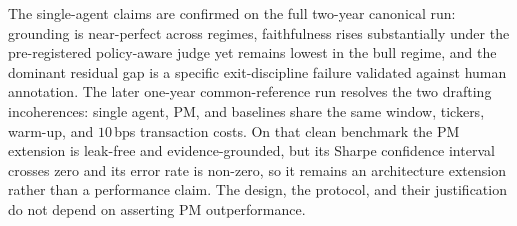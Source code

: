 The single-agent claims are confirmed on the full two-year canonical run: grounding is
near-perfect across regimes, faithfulness rises substantially under the pre-registered
policy-aware judge yet remains lowest in the bull regime, and the dominant residual gap is a
specific exit-discipline failure validated against human annotation. The later one-year
common-reference run resolves the two drafting incoherences: single agent, PM, and baselines
share the same window, tickers, warm-up, and $10$\,bps transaction costs. On that clean
benchmark the PM extension is leak-free and evidence-grounded, but its Sharpe confidence
interval crosses zero and its error rate is non-zero, so it remains an architecture extension
rather than a performance claim. The design, the protocol, and their justification do not
depend on asserting PM outperformance.
